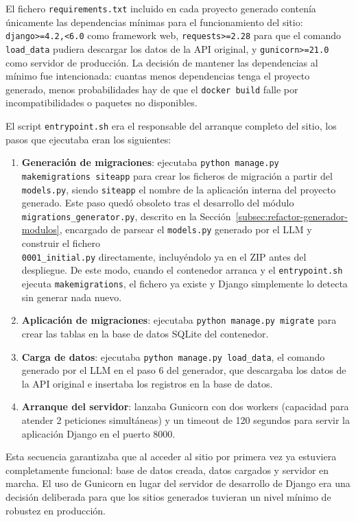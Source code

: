 El fichero \texttt{requirements.txt} incluido en cada proyecto generado contenía únicamente las dependencias mínimas para el funcionamiento del sitio: \texttt{django>=4.2,<6.0} como framework web, \texttt{requests>=2.28} para que el comando \texttt{load\_data} pudiera descargar los datos de la API original, y \texttt{gunicorn>=21.0} como servidor de producción. La decisión de mantener las dependencias al mínimo fue intencionada: cuantas menos dependencias tenga el proyecto generado, menos probabilidades hay de que el \texttt{docker build} falle por incompatibilidades o paquetes no disponibles.

El script \texttt{entrypoint.sh} era el responsable del arranque completo del sitio, los pasos que ejecutaba eran los siguientes:

\begin{enumerate}
    \item \textbf{Generación de migraciones}: ejecutaba \texttt{python manage.py makemigrations siteapp} para crear los ficheros de migración a partir del \texttt{models.py}, siendo \texttt{siteapp} el nombre de la aplicación interna del proyecto generado. Este paso quedó obsoleto tras el desarrollo del módulo \texttt{migrations\_generator.py}, descrito en la Sección~\ref{subsec:refactor-generador-modulos}, encargado de parsear el \texttt{models.py} generado por el LLM y construir el fichero \\ \texttt{0001\_initial.py} directamente, incluyéndolo ya en el ZIP antes del despliegue. De este modo, cuando el contenedor arranca y el \texttt{entrypoint.sh} ejecuta \texttt{makemigrations}, el fichero ya existe y Django simplemente lo detecta sin generar nada nuevo.
    \item \textbf{Aplicación de migraciones}: ejecutaba \texttt{python manage.py migrate} para crear las tablas en la base de datos SQLite del contenedor.
    \item \textbf{Carga de datos}: ejecutaba \texttt{python manage.py load\_data}, el comando generado por el LLM en el paso 6 del generador, que descargaba los datos de la API original e insertaba los registros en la base de datos.
    \item \textbf{Arranque del servidor}: lanzaba Gunicorn con dos workers (capacidad para atender 2 peticiones simultáneas) y un timeout de 120 segundos para servir la aplicación Django en el puerto 8000.
\end{enumerate}

Esta secuencia garantizaba que al acceder al sitio por primera vez ya estuviera completamente funcional: base de datos creada, datos cargados y servidor en marcha. El uso de 
Gunicorn en lugar del servidor de desarrollo de Django era una decisión deliberada para que los sitios generados tuvieran un nivel mínimo de robustez en producción.


